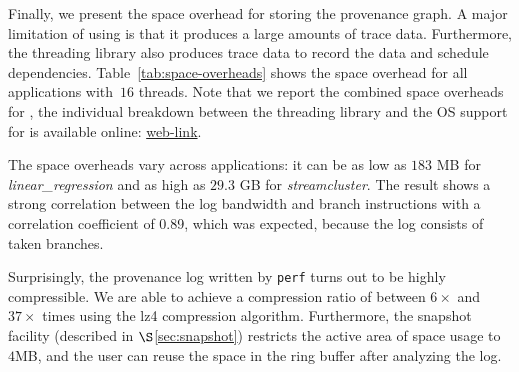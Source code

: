 Finally, we present the space overhead for storing the provenance graph. A major limitation of using \intelpt is that it produces a large amounts of trace data. Furthermore, the threading library also produces trace data to record the data and schedule dependencies.  Table~\ref{tab:space-overheads} shows the space overhead for all applications with~$16$ threads. Note that we report the combined space overheads for \projecttitle, the individual breakdown between the threading library and the OS support for \intelpt is available online:  \href{https://mic92.github.io/inspector/index.html\#measurement_table}{web-link}. 

The space overheads vary across applications: it can be as low as $183$ MB for {\em linear\_regression} and as high as $29.3$ GB for {\em streamcluster}. The result shows a strong correlation between the log bandwidth and branch instructions with a correlation coefficient of 0.89, which was expected, because the
log consists of taken branches.

Surprisingly,  the provenance log written by {\tt perf} turns out to be highly compressible. We
are able to achieve a compression ratio of between $6\times$ and $37\times$ times using the lz4 compression algorithm. 
Furthermore, the snapshot facility (described in $\S$\ref{sec:snapshot}) restricts the active area of space usage to $4$MB, and the user can reuse the space in the ring buffer after analyzing the log.








